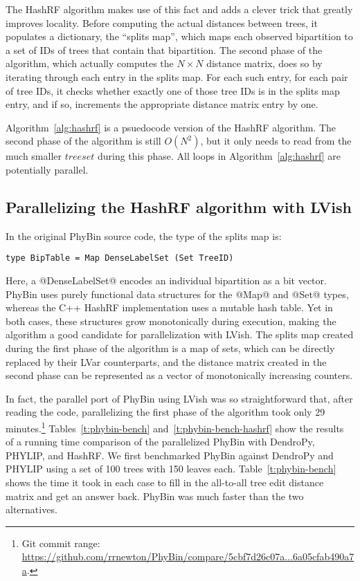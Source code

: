 The HashRF algorithm makes use of this fact and adds a clever trick
that greatly improves locality.  Before computing the actual distances
between trees, it populates a dictionary, the ``splits map'', which maps
each observed bipartition to a set of IDs of trees that contain that
bipartition.  The second phase of the algorithm, which actually
computes the $N \times N$ distance matrix, does so by iterating
through each entry in the splits map.  For each such entry, for each
pair of tree IDs, it checks whether exactly one of those tree IDs is
in the splits map entry, and if so, increments the appropriate
distance matrix entry by one.

Algorithm~\ref{alg:hashrf} is a psuedocode version of the HashRF
algorithm.  The second phase of the algorithm is still $O(N^2)$, but
it only needs to read from the much smaller $\mathit{treeset}$ during
this phase.  All loops in Algorithm~\ref{alg:hashrf} are potentially
parallel.

\subsection{Parallelizing the HashRF algorithm with LVish}

In the original PhyBin source code, the type of the splits map is:

\singlespacing
\begin{lstlisting}
type BipTable = Map DenseLabelSet (Set TreeID)
\end{lstlisting}
\doublespacing

\noindent Here, a @DenseLabelSet@ encodes an individual bipartition as
a bit vector.  PhyBin uses purely functional data structures for the
@Map@ and @Set@ types, whereas the C++ HashRF implementation uses a
mutable hash table.  Yet in both cases, these structures grow
monotonically during execution, making the algorithm a good candidate
for parallelization with LVish.  The splits map created during the
first phase of the algorithm is a map of sets, which can be directly
replaced by their LVar counterparts, and the distance matrix created
in the second phase can be represented as a vector of monotonically
increasing counters.

In fact, the parallel port of PhyBin using LVish was so
straightforward that, after reading the code, parallelizing the first
phase of the algorithm took only 29 minutes.\footnote{Git commit
  range:
  \url{https://github.com/rrnewton/PhyBin/compare/5cbf7d26c07a...6a05cfab490a7a}.}
Tables~\ref{t:phybin-bench} and~\ref{t:phybin-bench-hashrf} show the
results of a running time comparison of the parallelized PhyBin with
DendroPy, PHYLIP, and HashRF.  We first benchmarked PhyBin against
DendroPy and PHYLIP using a set of 100 trees with 150 leaves each.
Table~\ref{t:phybin-bench} shows the time it took in each case to fill
in the all-to-all tree edit distance matrix and get an answer back.
PhyBin was much faster than the two alternatives.

